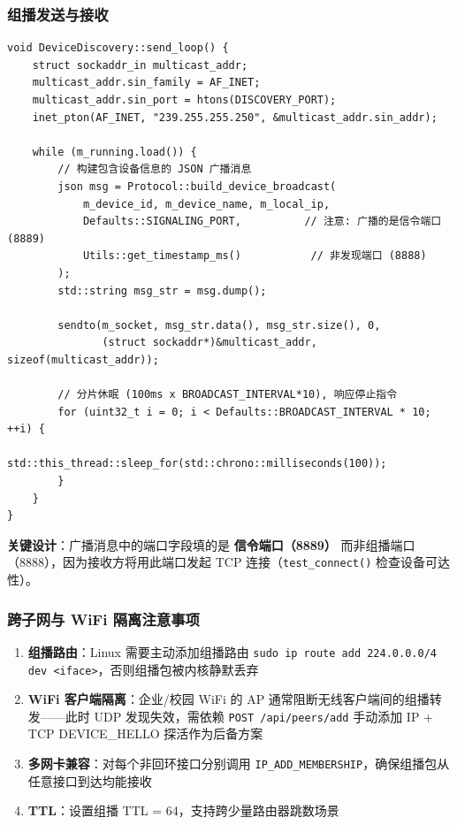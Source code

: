 \documentclass[12pt]{article}
\begin{document}
\subsubsection{组播发送与接收}

\begin{lstlisting}[caption={组播发送循环 (send\_loop)}]
void DeviceDiscovery::send_loop() {
    struct sockaddr_in multicast_addr;
    multicast_addr.sin_family = AF_INET;
    multicast_addr.sin_port = htons(DISCOVERY_PORT);
    inet_pton(AF_INET, "239.255.255.250", &multicast_addr.sin_addr);

    while (m_running.load()) {
        // 构建包含设备信息的 JSON 广播消息
        json msg = Protocol::build_device_broadcast(
            m_device_id, m_device_name, m_local_ip,
            Defaults::SIGNALING_PORT,          // 注意: 广播的是信令端口 (8889)
            Utils::get_timestamp_ms()           // 非发现端口 (8888)
        );
        std::string msg_str = msg.dump();

        sendto(m_socket, msg_str.data(), msg_str.size(), 0,
               (struct sockaddr*)&multicast_addr, sizeof(multicast_addr));

        // 分片休眠 (100ms x BROADCAST_INTERVAL*10), 响应停止指令
        for (uint32_t i = 0; i < Defaults::BROADCAST_INTERVAL * 10; ++i) {
            std::this_thread::sleep_for(std::chrono::milliseconds(100));
        }
    }
}
\end{lstlisting}

\textbf{关键设计}：广播消息中的端口字段填的是 \textbf{信令端口（8889）} 而非组播端口（8888），因为接收方将用此端口发起 TCP 连接（\texttt{test\_connect()} 检查设备可达性）。

\subsubsection{跨子网与 WiFi 隔离注意事项}

\begin{enumerate}
    \item \textbf{组播路由}：Linux 需要主动添加组播路由 \texttt{sudo ip route add 224.0.0.0/4 dev <iface>}，否则组播包被内核静默丢弃
    \item \textbf{WiFi 客户端隔离}：企业/校园 WiFi 的 AP 通常阻断无线客户端间的组播转发——此时 UDP 发现失效，需依赖 \texttt{POST /api/peers/add} 手动添加 IP + TCP DEVICE\_HELLO 探活作为后备方案
    \item \textbf{多网卡兼容}：对每个非回环接口分别调用 \texttt{IP\_ADD\_MEMBERSHIP}，确保组播包从任意接口到达均能接收
    \item \textbf{TTL}：设置组播 TTL = 64，支持跨少量路由器跳数场景
\end{enumerate}
\end{document}
